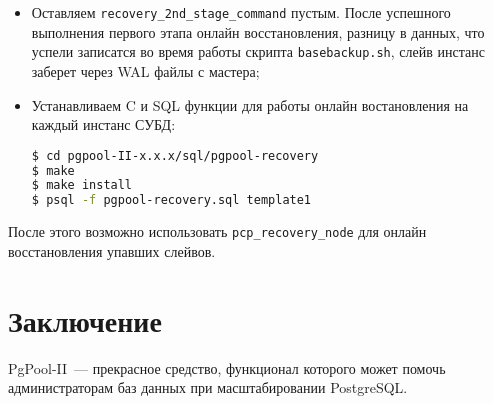 \begin{itemize}
  \item Оставляем \lstinline!recovery_2nd_stage_command! пустым. После успешного выполнения первого этапа онлайн восстановления, разницу в данных, что успели записатся во время работы скрипта \lstinline!basebackup.sh!, слейв инстанс заберет через WAL файлы с мастера;

  \item Устанавливаем C и SQL функции для работы онлайн востановления на каждый инстанс СУБД:

\begin{lstlisting}[language=Bash,label=lst:pgpool46,caption=Устанавливаем C и SQL функции]
$ cd pgpool-II-x.x.x/sql/pgpool-recovery
$ make
$ make install
$ psql -f pgpool-recovery.sql template1
\end{lstlisting}

\end{itemize}

После этого возможно использовать \lstinline!pcp_recovery_node! для онлайн восстановления упавших слейвов.


\section{Заключение}

PgPool-II~--- прекрасное средство, функционал которого может помочь администраторам баз данных при масштабировании PostgreSQL.
